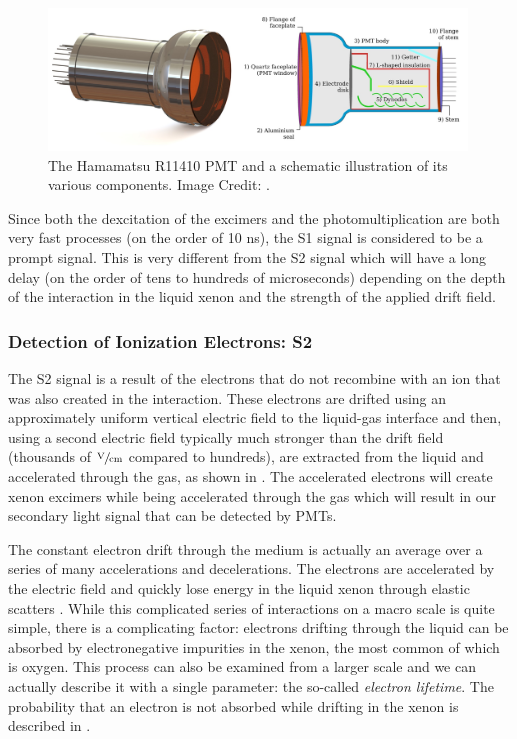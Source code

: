  \begin{figure}[t]
	\centering
	\includegraphics[width=0.99\textwidth]{tpc_pmt}
	\caption{The Hamamatsu R11410 PMT and a schematic illustration of its various components.  Image Credit: .}
	\label{fig:tpc_pmt}
\end{figure}

Since both the dexcitation of the excimers and the photomultiplication are both very fast processes (on the order of 10 ns), the S1 signal is considered to be a prompt signal.  This is very different from the S2 signal which will have a long delay (on the order of tens to hundreds of microseconds) depending on the depth of the interaction in the liquid xenon and the strength of the applied drift field.


\subsubsection{Detection of Ionization Electrons: S2}
\label{sec:tpc_s2_sig}

The S2 signal is a result of the electrons that do not recombine with an ion that was also created in the interaction.  These electrons are drifted using an approximately uniform vertical electric field to the liquid-gas interface and then, using a second electric field typically much stronger than the drift field (thousands of $\sfrac{\textrm{V}}{\textrm{cm}}$ compared to hundreds), are extracted from the liquid and accelerated through the gas, as shown in .  The accelerated electrons will create xenon excimers while being accelerated through the gas which will result in our secondary light signal that can be detected by PMTs.

The constant electron drift through the medium is actually an average over a series of many accelerations and decelerations.  The electrons are accelerated by the electric field and quickly lose energy in the liquid xenon through elastic scatters \cite{atrazhev2005electron}.  While this complicated series of interactions on a macro scale is quite simple, there is a complicating factor: electrons drifting through the liquid can be absorbed by electronegative impurities in the xenon, the most common of which is oxygen.  This process can also be examined from a larger scale and we can actually describe it with a single parameter: the so-called \textit{electron lifetime}.  The probability that an electron is not absorbed while drifting in the xenon is described in .

